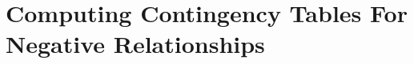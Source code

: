 \documentclass{sig-alternate-2013}
\begin{document}
\section{Computing Contingency Tables For Negative Relationships} 
\end{document}
